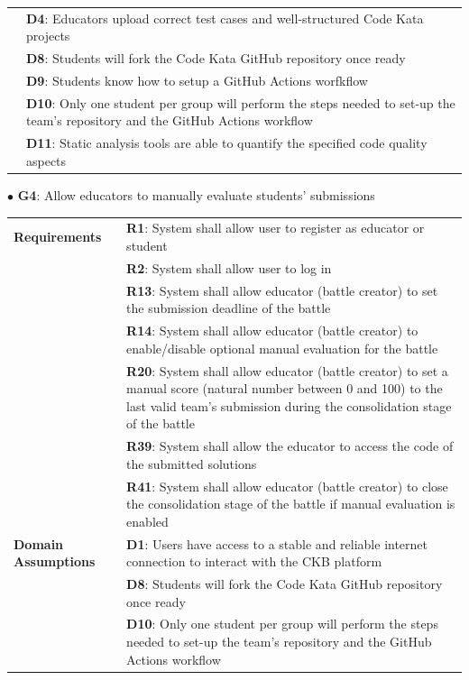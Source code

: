\begin{center}
\begin{tabular}{ |m{3cm}|m{10cm}| }
        & \textbf{D4}: Educators upload correct test cases and well-structured Code Kata projects \\
        & \textbf{D8}: Students will fork the Code Kata GitHub repository once ready \\
        & \textbf{D9}: Students know how to setup a GitHub Actions worfkflow \\
        & \textbf{D10}: Only one student per group will perform the steps needed to set-up the team's repository and the GitHub Actions workflow \\
        & \textbf{D11}: Static analysis tools are able to quantify the specified code quality aspects \\
        \hline
    \end{tabular}
\end{center} 
$\bullet$ \textbf{G4}: Allow educators to manually evaluate students' submissions
\begin{center}
    \begin{tabular}{ |m{3cm}|m{10cm}| }
        \hline
        \textbf{Requirements} 
        & \textbf{R1}: System shall allow user to register as educator or student \\
        & \textbf{R2}: System shall allow user to log in \\
        & \textbf{R13}: System shall allow educator (battle creator) to set the submission deadline of the battle \\
        & \textbf{R14}: System shall allow educator (battle creator) to enable/disable optional manual evaluation for the battle \\
        & \textbf{R20}: System shall allow educator (battle creator) to set a manual score (natural number between 0 and 100) to the last valid team’s submission during the consolidation stage of the battle \\
        & \textbf{R39}: System shall allow the educator to access the code of the submitted solutions \\
        & \textbf{R41}: System shall allow educator (battle creator) to close the consolidation stage of the battle if manual evaluation is enabled \\
        \hline
        \textbf{Domain \newline Assumptions} 
        & \textbf{D1}: Users have access to a stable and reliable internet connection to interact with the CKB platform \\
        & \textbf{D8}: Students will fork the Code Kata GitHub repository once ready \\
        & \textbf{D10}: Only one student per group will perform the steps needed to set-up the team's repository and the GitHub Actions workflow \\
        \hline
    \end{tabular}
\end{center} 
